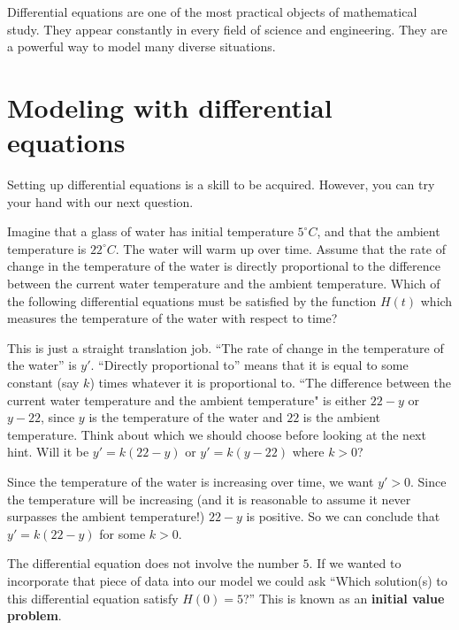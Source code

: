 \documentclass{ximera}
\begin{document}
Differential equations are one of the most practical objects of
mathematical study.  They appear constantly in every field of science
and engineering.  They are a powerful way to model many diverse
situations.





\section{Modeling with differential equations}

Setting up differential equations is a skill to be acquired. However,
you can try your hand with our next question.

\begin{question}
  Imagine that a glass of water has initial temperature $5^\circ
  \unit{C}$, and that the ambient temperature is $22^\circ \unit{C}$.
  The water will warm up over time.  Assume that the rate of change in
  the temperature of the water is directly proportional to the
  difference between the current water temperature and the ambient
  temperature.  Which of the following differential equations must be
  satisfied by the function $H(t)$ which measures the temperature of
  the water with respect to time?
  \begin{multipleChoice}
  \end{multipleChoice}
  \begin{hint}
    This is just a straight translation job.  ``The rate of change in
    the temperature of the water'' is $y'$.  ``Directly proportional
    to'' means that it is equal to some constant (say $k$) times
    whatever it is proportional to.  ``The difference between the
    current water temperature and the ambient temperature" is either
    $22-y$ or $y-22$, since $y$ is the temperature of the water and
    $22$ is the ambient temperature.  Think about which we should
    choose before looking at the next hint.  Will it be $y'=k(22-y)$
    or $y'=k(y-22)$ where $k>0$?
  \end{hint}
  \begin{hint}
    Since the temperature of the water is increasing over time, we
    want $y'>0$.  Since the temperature will be increasing (and it is
    reasonable to assume it never surpasses the ambient temperature!)
    $22-y$ is positive.  So we can conclude that $y' = k(22-y)$ for
    some $k>0$.
  \end{hint}
  
  \begin{feedback}
    The differential equation does not involve the number $5$.  If we
    wanted to incorporate that piece of data into our model we could
    ask ``Which solution(s) to this differential equation satisfy
    $H(0) = 5$?''  This is known as an \textbf{initial value problem}.  %
  \end{feedback}
\end{question}
\end{document}
